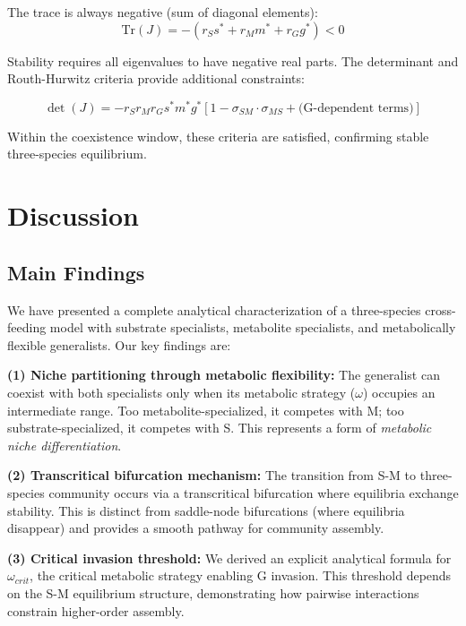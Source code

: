 \documentclass[11pt]{article}
\begin{document}
The trace is always negative (sum of diagonal elements):
\begin{equation}
\text{Tr}(J) = -(r_S s^* + r_M m^* + r_G g^*) < 0
\end{equation}

Stability requires all eigenvalues to have negative real parts. The determinant and Routh-Hurwitz criteria provide additional constraints:

\begin{equation}
\det(J) = -r_S r_M r_G s^* m^* g^* \left[1 - \sigma_{SM}\cdot\sigma_{MS} + \text{(G-dependent terms)}\right]
\end{equation}

Within the coexistence window, these criteria are satisfied, confirming stable three-species equilibrium.

\section{Discussion}

\subsection{Main Findings}

We have presented a complete analytical characterization of a three-species cross-feeding model with substrate specialists, metabolite specialists, and metabolically flexible generalists. Our key findings are:

\textbf{(1) Niche partitioning through metabolic flexibility:} The generalist can coexist with both specialists only when its metabolic strategy ($\omega$) occupies an intermediate range. Too metabolite-specialized, it competes with M; too substrate-specialized, it competes with S. This represents a form of \textit{metabolic niche differentiation}.

\textbf{(2) Transcritical bifurcation mechanism:} The transition from S-M to three-species community occurs via a transcritical bifurcation where equilibria exchange stability. This is distinct from saddle-node bifurcations (where equilibria disappear) and provides a smooth pathway for community assembly.

\textbf{(3) Critical invasion threshold:} We derived an explicit analytical formula for $\omega_{crit}$, the critical metabolic strategy enabling G invasion. This threshold depends on the S-M equilibrium structure, demonstrating how pairwise interactions constrain higher-order assembly.
\end{document}
